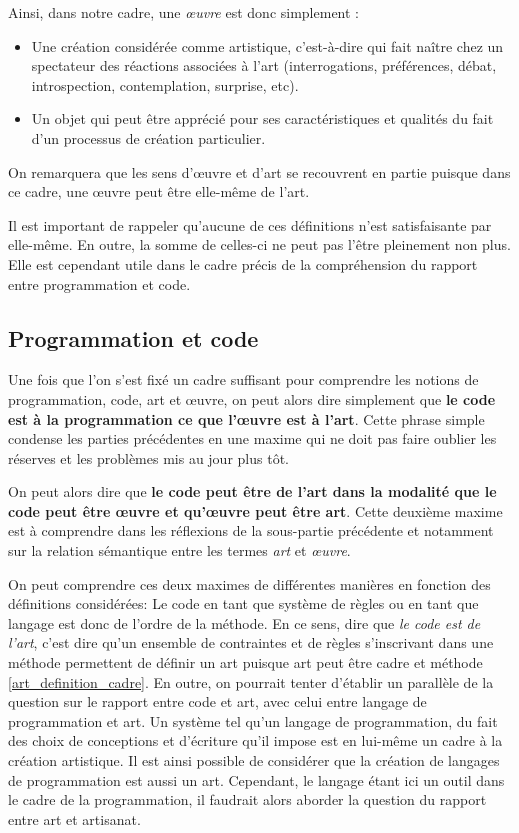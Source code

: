 \documentclass[12pt]{article} %
\begin{document}
Ainsi, dans notre cadre, une \textit{œuvre} est donc simplement :
\begin{itemize}
    \item Une création considérée comme artistique, c'est-à-dire qui fait naître chez un spectateur des réactions associées à l'art (interrogations, préférences, débat, introspection, contemplation, surprise, etc).
    \item Un objet qui peut être apprécié pour ses caractéristiques et qualités du fait d'un processus de création particulier.
\end{itemize}
On remarquera que les sens d'œuvre et d'art se recouvrent en partie puisque dans ce cadre, une œuvre peut être elle-même de l'art.

Il est important de rappeler qu'aucune de ces définitions n'est satisfaisante par elle-même. En outre, la somme de celles-ci ne peut pas l'être pleinement non plus. Elle est cependant utile dans le cadre précis de la compréhension du rapport entre programmation et code.

\subsection{Programmation et code} %
Une fois que l'on s'est fixé un cadre suffisant pour comprendre les notions de programmation, code, art et œuvre, on peut alors dire simplement que \textbf{le code est à la programmation ce que l'œuvre est à l'art}. Cette phrase simple condense les parties précédentes en une maxime qui ne doit pas faire oublier les réserves et les problèmes mis au jour plus tôt.

On peut alors dire que \textbf{le code peut être de l'art dans la modalité que le code peut être œuvre et qu'œuvre peut être art}. Cette deuxième maxime est à comprendre dans les réflexions de la sous-partie précédente et notamment sur la relation sémantique entre les termes \textit{art} et \textit{œuvre}.

On peut comprendre ces deux maximes de différentes manières en fonction des définitions considérées: Le code en tant que système de règles ou en tant que langage est donc de l'ordre de la méthode. En ce sens, dire que \textit{le code est de l'art}, c'est dire qu'un ensemble de contraintes et de règles s'inscrivant dans une méthode permettent de définir un art puisque art peut être cadre et méthode \ref{art_definition_cadre}. En outre, on pourrait tenter d'établir un parallèle de la question sur le rapport entre code et art, avec celui entre langage de programmation et art. Un système tel qu'un langage de programmation, du fait des choix de conceptions et d'écriture qu'il impose est en lui-même un cadre à la création artistique. Il est ainsi possible de considérer que la création de langages de programmation est aussi un art. Cependant, le langage étant ici un outil dans le cadre de la programmation, il faudrait alors aborder la question du rapport entre art et artisanat. 
\end{document}
